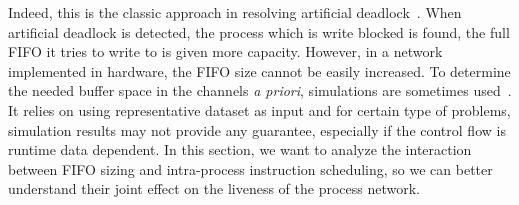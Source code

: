 Indeed, this is the classic approach in resolving artificial deadlock~\cite{boundedwrite}. 
When artificial deadlock is detected, the process which is write blocked is found, the full FIFO it tries to write to is given more capacity. 
However, in a network implemented in hardware, the FIFO size cannot be easily increased.
To determine the needed buffer space in the channels \textit{a priori}, simulations are sometimes used~\cite{buck1994ptolemy}. It relies 
on using representative dataset as input and for certain type of problems, simulation results may not provide any guarantee, especially if the control flow is runtime data dependent. In this section, we want to analyze the interaction between FIFO
sizing and intra-process instruction scheduling, 
so we can 
better understand
their joint effect on the liveness of the process network. 

